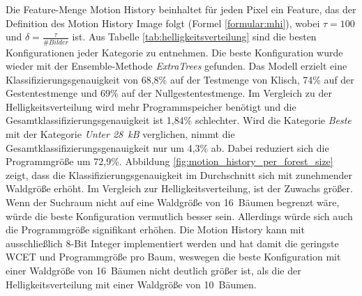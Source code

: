Die Feature-Menge Motion History beinhaltet für jeden Pixel ein Feature, das der Definition des Motion History Image folgt (Formel \ref{formular:mhi}), wobei $\tau=100$ und $\delta=\frac{\tau}{\#Bilder}$ ist.
\newline
\newline
Aus Tabelle \ref{tab:helligkeitsverteilung} sind die besten Konfigurationen jeder Kategorie zu entnehmen. Die beste Konfiguration wurde wieder mit der Ensemble-Methode \textit{ExtraTrees} gefunden.
Das Modell erzielt eine Klassifizierungsgenauigkeit von 68,8\% auf der Testmenge von Klisch, 74\% auf der Gestentestmenge und 69\% auf der Nullgestentestmenge. Im Vergleich zu der Helligkeitsverteilung
wird mehr Programmspeicher benötigt und die Gesamtklassifizierungsgenauigkeit ist 1,84\% schlechter.
\newline
\newline
Wird die Kategorie \textit{Beste} mit der Kategorie \textit{Unter 28~kB} verglichen, nimmt die Gesamtklassifizierungsgenauigkeit nur um 4,3\% ab. Dabei reduziert sich die Programmgröße um 72,9\%.
Abbildung \ref{fig:motion_history_per_forest_size} zeigt, dass die Klassifizierungsgenauigkeit im Durchschnitt sich mit zunehmender Waldgröße erhöht. Im Vergleich zur Helligkeitsverteilung, ist der Zuwachs größer.
Wenn der Suchraum nicht auf eine Waldgröße von 16~Bäumen begrenzt wäre, würde die beste Konfiguration vermutlich besser sein. Allerdings würde sich auch die Programmgröße signifikant erhöhen.
\newline
\newline
Die Motion History kann mit ausschließlich 8-Bit Integer implementiert werden und hat damit die geringste WCET und Programmgröße pro Baum, weswegen die beste Konfiguration mit einer Waldgröße von 16~Bäumen nicht deutlich
größer ist, als die der Helligkeitsverteilung mit einer Waldgröße von 10~Bäumen.
